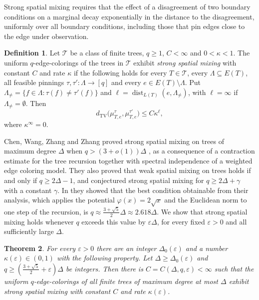 \documentclass{amsart}
\numberwithin{equation}{section}
\theoremstyle{plain}
\newtheorem{theorem}{Theorem}[section]
\theoremstyle{definition}
\newtheorem{definition}[theorem]{Definition}
\theoremstyle{remark}
\newcommand{\dTV}{d_{\mathrm{TV}}}
\newcommand{\dist}{\operatorname{dist}}
\begin{document}
Strong spatial mixing requires that the effect of a disagreement of two boundary conditions on a marginal decay exponentially in the distance to the disagreement, uniformly over all boundary conditions, including those that pin edges close to the edge under observation.

\begin{definition}\label{def:ssm}
Let $\mathcal T$ be a class of finite trees, $q\ge1$, $C<\infty$ and $0<\kappa<1$. The uniform $q$-edge-colorings of the trees in $\mathcal T$ exhibit \emph{strong spatial mixing} with constant $C$ and rate $\kappa$ if the following holds for every $T\in\mathcal T$, every $\Lambda\subseteq E(T)$, all feasible pinnings $\tau,\tau'\colon\Lambda\to[q]$ and every $e\in E(T)\setminus\Lambda$. Put $\Lambda_{\ne}=\{f\in\Lambda:\tau(f)\ne\tau'(f)\}$ and $\ell=\dist_{L(T)}(e,\Lambda_{\ne})$, with $\ell=\infty$ if $\Lambda_{\ne}=\emptyset$. Then
\[
\dTV\bigl(\mu_{T,e}^{\tau},\mu_{T,e}^{\tau'}\bigr)\le C\kappa^{\ell},
\]
where $\kappa^\infty=0$.
\end{definition}

Chen, Wang, Zhang and Zhang \cite{CWZZ} proved strong spatial mixing on trees of maximum degree $\Delta$ when $q>(3+o(1))\Delta$ \cite[Theorem~22]{CWZZ}, as a consequence of a contraction estimate for the tree recursion together with spectral independence of a weighted edge coloring model. They also proved that weak spatial mixing on trees holds if and only if $q\ge2\Delta-1$, and conjectured strong spatial mixing for $q\ge2\Delta+\gamma$ with a constant $\gamma$. In \cite[Section~5.3 and Theorem~35]{CWZZ} they showed that the best condition obtainable from their analysis, which applies the potential $\varphi(x)=2\sqrt x$ and the Euclidean norm to one step of the recursion, is $q\approx\frac{3+\sqrt5}{2}\Delta\approx2.618\Delta$. We show that strong spatial mixing holds whenever $q$ exceeds this value by $\varepsilon\Delta$, for every fixed $\varepsilon>0$ and all sufficiently large $\Delta$.

\begin{theorem}\label{thm:main}
For every $\varepsilon>0$ there are an integer $\Delta_0(\varepsilon)$ and a number $\kappa(\varepsilon)\in(0,1)$ with the following property. Let $\Delta\ge\Delta_0(\varepsilon)$ and $q\ge(\frac{3+\sqrt5}{2}+\varepsilon)\Delta$ be integers. Then there is $C=C(\Delta,q,\varepsilon)<\infty$ such that the uniform $q$-edge-colorings of all finite trees of maximum degree at most $\Delta$ exhibit strong spatial mixing with constant $C$ and rate $\kappa(\varepsilon)$.
\end{theorem}
\end{document}
